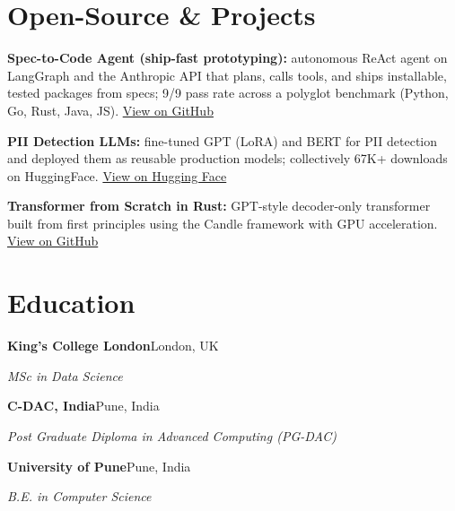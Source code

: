 \documentclass[10pt,a4paper]{article}
\begin{document}
\section{Open-Source \& Projects}
\begin{tight}
  \item \textbf{Spec-to-Code Agent (ship-fast prototyping):} autonomous ReAct agent on LangGraph and the Anthropic API that plans, calls tools, and ships installable, tested packages from specs; 9/9 pass rate across a polyglot benchmark (Python, Go, Rust, Java, JS). \href{https://github.com/abhijeetscode/Spec-to-Code-Agent}{View on GitHub}
  \item \textbf{PII Detection LLMs:} fine-tuned GPT (LoRA) and BERT for PII detection and deployed them as reusable production models; collectively 67K+ downloads on HuggingFace. \href{https://huggingface.co/ab-ai/pii_model}{View on Hugging Face}
  \item \textbf{Transformer from Scratch in Rust:} GPT-style decoder-only transformer built from first principles using the Candle framework with GPU acceleration. \href{https://github.com/abhijeetscode/transformer-rust}{View on GitHub}
\end{tight}

\section{Education}
{\color{company}\bfseries King's College London}\hfill {\color{muted}London, UK}\par
{\itshape MSc in Data Science}\par\vspace{2pt}
{\color{company}\bfseries C-DAC, India}\hfill {\color{muted}Pune, India}\par
{\itshape Post Graduate Diploma in Advanced Computing (PG-DAC)}\par\vspace{2pt}
{\color{company}\bfseries University of Pune}\hfill {\color{muted}Pune, India}\par
{\itshape B.E. in Computer Science}\par
\end{document}
